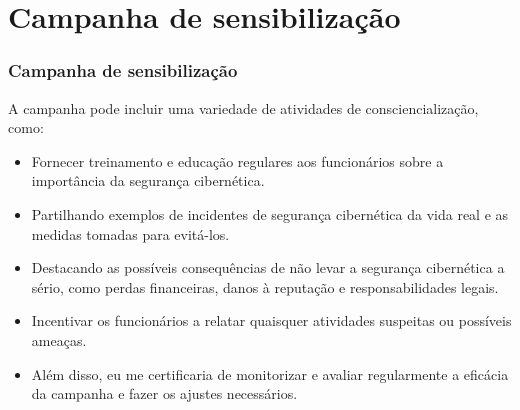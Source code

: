\section{Campanha de sensibilização}
\begin{frame}
  \frametitle{Campanha de sensibilização}
  A campanha pode incluir uma variedade de atividades de consciencialização, como:
  \begin{itemize}
    \item Fornecer treinamento e educação regulares aos funcionários sobre a importância da segurança cibernética.
    \item Partilhando exemplos de incidentes de segurança cibernética da vida real e as medidas tomadas para evitá-los.
    \item Destacando as possíveis consequências de não levar a segurança cibernética a sério, como perdas financeiras, danos à reputação e responsabilidades legais.
    \item Incentivar os funcionários a relatar quaisquer atividades suspeitas ou possíveis ameaças.
    \item Além disso, eu me certificaria de monitorizar e avaliar regularmente a eficácia da campanha e fazer os ajustes necessários.
  \end{itemize}
\end{frame}

